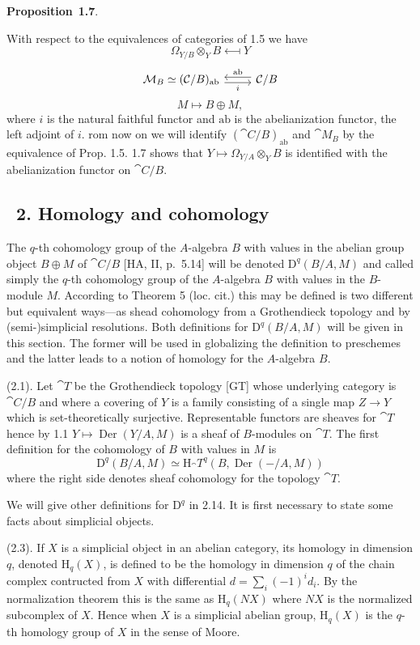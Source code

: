 \documentclass[10pt,reqno]{amsart}
\DeclareMathOperator{\Der}{Der}
\newenvironment{prop}[1]{
\par\medskip\noindent\textbf{Proposition}~\textbf{#1}.\,\itshape
}
\newcommand{\cat}{\mathcal}
\newcommand{\C}{\cat{C}}
\newcommand{\M}{\cat{M}}
\newcommand{\T}{\cat{T}}
\renewcommand{\H}{\mathrm{H}}
\newcommand{\D}{\mathrm{D}}
\newcommand{\Diff}{\Omega}
\begin{document}
\begin{prop}{1.7}
With respect to the equivalences of categories of 1.5 we have
\[
  \Diff_{Y/B}\otimes_Y B\longmapsfrom Y
\]
\[
  \begin{tikzcd}
  {\M_B\simeq(\C/B)_\mathrm{ab}}\ar[r,"i"',shift right]
  & {\C/B}\ar[l,"\mathrm{ab}"',shift right]
  \end{tikzcd}
\]
\[
  M\longmapsto B\oplus M,
\]
where $i$ is the natural faithful functor and $\mathrm{ab}$ is the abelianization functor,
the left adjoint of $i$.
\end{prop}

From now on we will identify $(\C/B)_\mathrm{ab}$ and $\M_B$ by the equivalence of
Prop. 1.5. 1.7 shows that $Y\mapsto\Diff_{Y/A}\otimes_Y B$ is identified with the
abelianization functor on $\C/B$.

\subsection*{\textsection~2. Homology and cohomology}

The $q$-th cohomology group of the $A$-algebra $B$ with values in the abelian group
object $B\oplus M$ of $\C/B$ [HA, II, p.~5.14] will be denoted
$\D^q(B/A,M)$ and called simply the $q$-th cohomology group of the $A$-algebra $B$
with values in the $B$-module $M$. According to Theorem 5 (loc. cit.) this may be
defined is two different but equivalent ways---as shead cohomology from a
Grothendieck topology and by (semi-)simplicial resolutions. Both definitions for
$\D^q(B/A,M)$ will be given in this section. The former will be used in globalizing
the definition to preschemes and the latter leads to a notion of homology for the
$A$-algebra $B$.

(2.1). Let $\T$ be the Grothendieck topology [GT] whose underlying
category is $\C/B$ and where a covering of $Y$ is a family consisting of a single map
$Z\to Y$ which is set-theoretically surjective. Representable functors are sheaves for
$\T$ hence by 1.1 $Y\mapsto\Der(Y/A,M)$ is a sheaf of $B$-modules on $\T$.
The first definition for the cohomology of $B$ with values in $M$ is
\[
  \D^q(B/A,M)\simeq\H_\T^q(B,\Der(-/A,M))\tag{2.2}
\]
where the right side denotes sheaf cohomology for the topology $\T$.

We will give other definitions for $\D^q$ in 2.14. It is first necessary to state some
facts about simplicial objects.

(2.3). If $X$ is a simplicial object in an abelian category, its homology in
dimension $q$, denoted $\H_q(X)$, is defined to be the homology in dimension $q$ of
the chain complex contructed from $X$ with differential $d=\sum_i(-1)^i d_i$. By the
normalization theorem this is the same as $\H_q(NX)$ where $NX$ is the normalized
subcomplex of $X$. Hence when $X$ is a simplicial abelian group, $\H_q(X)$ is the
$q$-th homology group of $X$ in the sense of Moore.
\end{document}
